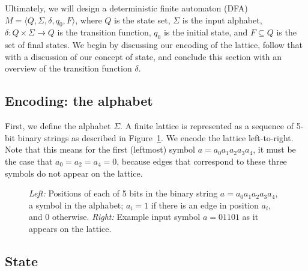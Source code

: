 Ultimately, we will design a deterministic finite automaton (DFA) $M = \langle Q, \Sigma, \delta, q_0, F \rangle$, where $Q$ is the state set, $\Sigma$ is the input alphabet, $\delta : Q\times\Sigma \rightarrow Q$ is the transition function, $q_0$ is the initial state, and $F\subseteq Q$ is the set of final states. We begin by discussing our encoding of the lattice, follow that with a discussion of our concept of state, and conclude this section with an overview of the transition function $\delta$.

\subsection{Encoding: the alphabet}
\label{sec:overview-alphabet}

First, we define the alphabet $\Sigma$. A finite lattice is represented as a sequence of 5-bit binary strings as described in Figure~\ref{fig:encoding-symbol}. We encode the lattice left-to-right. Note that this means for the first (leftmost) symbol $a=a_0a_1a_2a_3a_4$, it must be the case that $a_0 = a_2 = a_4 = 0$, because edges that correspond to these three symbols do not appear on the lattice.

\begin{figure}
\begin{center}
\end{center}
\caption{\emph{Left:} Positions of each of 5 bits in the binary string $a = a_0a_1a_2a_3a_4$, a symbol in the alphabet; $a_i = 1$ if there is an edge in position $a_i$, and 0 otherwise. \emph{Right:} Example input symbol $a=01101$ as it appears on the lattice.}
\label{fig:encoding-symbol}
\end{figure}

\subsection{State}
\label{sec:overview-state}


